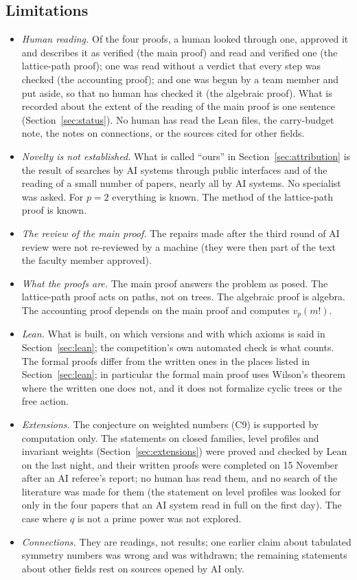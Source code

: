 \documentclass[11pt]{article}
\theoremstyle{definition}
\theoremstyle{remark}
\numberwithin{equation}{section}
\numberwithin{figure}{section}
\begin{document}
\subsection{Limitations}
\begin{itemize}[itemsep=1pt]
\item \emph{Human reading.} Of the four proofs, a human looked through one, approved it and describes it as verified (the main proof)
 and read and verified one (the lattice-path proof); one was read without a verdict that every step was
 checked (the accounting proof); and one was begun by a team member and put aside, so that no human has
 checked it (the algebraic proof). What is recorded about the extent of the reading of the main
 proof is one sentence (Section~\ref{sec:status}). No human has read the Lean files, the carry-budget note,
 the notes on connections, or the sources cited for other fields.
\item \emph{Novelty is not established.} What is called ``ours'' in Section~\ref{sec:attribution} is the
 result of searches by AI systems through public interfaces and of the reading of a small number of papers,
 nearly all by AI systems. No specialist was asked. For $p=2$ everything is known. The method of the
 lattice-path proof is known.
\item \emph{The review of the main proof.} The repairs made after the third round of AI review were not
 re-reviewed by a machine (they were then part of the text the faculty member approved).
\item \emph{What the proofs are.} The main proof answers the problem as posed. The lattice-path proof acts
 on paths, not on trees. The algebraic proof is algebra. The accounting proof depends on the main proof and
 computes $v_p(m!)$.
\item \emph{Lean.} What is built, on which versions and with which axioms is said in Section~\ref{sec:lean};
 the competition's own automated check is what counts. The formal proofs differ from the written ones in the
 places listed in Section~\ref{sec:lean}; in particular the formal main proof uses Wilson's theorem where the written one
 does not, and it does not formalize cyclic trees or the free action.
\item \emph{Extensions.} The conjecture on weighted numbers (C9) is supported by computation only. The
 statements on closed families, level profiles and invariant weights (Section~\ref{sec:extensions}) were
 proved and checked by Lean on the last night, and their written proofs were completed on 15 November after
 an AI referee's report; no human has read them, and no search of the literature was made for them (the
 statement on level profiles was looked for only in the four papers that an AI system read in full on the
 first day). The case where $q$ is not a prime power was not explored.
\item \emph{Connections.} They are readings, not results; one earlier claim about tabulated symmetry numbers
 was wrong and was withdrawn; the remaining statements about other fields rest on sources opened by AI only.
\end{itemize}
\end{document}
